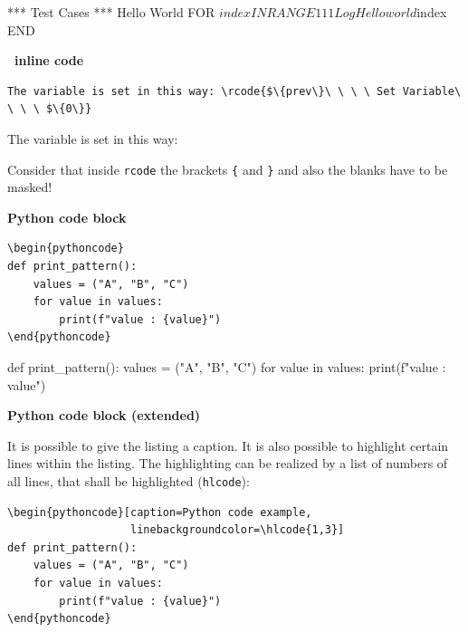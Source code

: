 \documentclass[a4paper,10pt]{report}
\begin{document}
\vspace{2ex}

\begin{robotcode}[caption=Robot code example,
                  linebackgroundcolor=\hlcode{1,4}]
*** Test Cases ***
Hello World
   FOR    ${index}    IN RANGE    1    11
      Log  Hello world ${index}
   END
\end{robotcode}

\newpage

\textbf{\rfw\ inline code}
\begin{verbatim}
The variable is set in this way: \rcode{$\{prev\}\ \ \ \ Set Variable\ \ \ \ $\{0\}}
\end{verbatim}

The variable is set in this way: 

Consider that inside \texttt{rcode} the brackets \texttt{\{} and \texttt{\}} and also the blanks have to be masked!


\vspace{2ex}

\textbf{Python code block}
\begin{verbatim}
\begin{pythoncode}
def print_pattern():
    values = ("A", "B", "C")
    for value in values:
        print(f"value : {value}")
\end{pythoncode}
\end{verbatim}

\begin{pythoncode}
def print_pattern():
    values = ("A", "B", "C")
    for value in values:
        print(f"value : {value}")
\end{pythoncode}

\vspace{2ex}

\textbf{Python code block (extended)}

It is possible to give the listing a caption. It is also possible to highlight certain lines within the listing. The highlighting can be realized by a list
of numbers of all lines, that shall be highlighted (\texttt{hlcode}):

\vspace{2ex}

\begin{verbatim}
\begin{pythoncode}[caption=Python code example,
                   linebackgroundcolor=\hlcode{1,3}]
def print_pattern():
    values = ("A", "B", "C")
    for value in values:
        print(f"value : {value}")
\end{pythoncode}
\end{verbatim}
\end{document}
